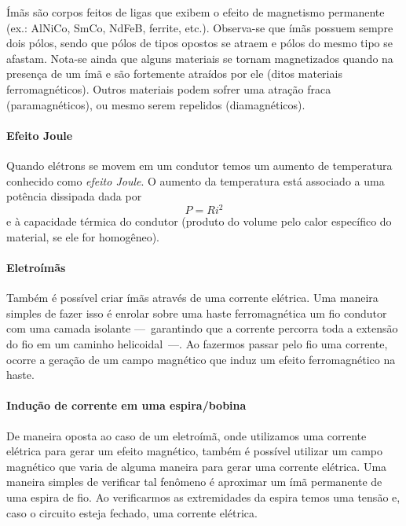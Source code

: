 Ímãs são corpos feitos de ligas que exibem o efeito de magnetismo permanente (ex.: AlNiCo, SmCo, NdFeB, ferrite, etc.). Observa-se que ímãs possuem sempre dois pólos, sendo que pólos de tipos opostos se atraem e pólos do mesmo tipo se afastam. Nota-se ainda que alguns materiais se tornam magnetizados quando na presença de um ímã e são fortemente atraídos por ele (ditos materiais ferromagnéticos). Outros materiais podem sofrer uma atração fraca (paramagnéticos), ou mesmo serem repelidos (diamagnéticos).

\paragraph{Efeito Joule}

Quando elétrons se movem em um condutor temos um aumento de temperatura conhecido como \emph{efeito Joule}. O aumento da temperatura está associado a uma potência dissipada dada por 
\begin{equation}
    P = R i^2
\end{equation}
%
e à capacidade térmica do condutor (produto do volume pelo calor específico do material, se ele for homogêneo).

\paragraph{Eletroímãs}

Também é possível criar ímãs através de uma corrente elétrica. Uma maneira simples de fazer isso é  enrolar sobre uma haste ferromagnética um fio condutor com uma camada isolante ---~garantindo que a corrente percorra toda a extensão do fio em um caminho helicoidal~---. Ao fazermos passar pelo fio uma corrente, ocorre a geração de um campo magnético que induz um efeito ferromagnético na haste.

\paragraph{Indução de corrente em uma espira/bobina}

De maneira oposta ao caso de um eletroímã, onde utilizamos uma corrente elétrica para gerar um efeito magnético, também é possível utilizar um campo magnético que varia de alguma maneira para gerar uma corrente elétrica. Uma maneira simples de verificar tal fenômeno é aproximar um ímã permanente de uma espira de fio. Ao verificarmos as extremidades da espira temos uma tensão e, caso o circuito esteja fechado, uma corrente elétrica.

